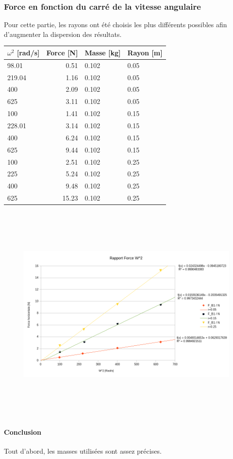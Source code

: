 \newpage
\subsubsection{Force en fonction du carré de la vitesse angulaire}

Pour cette partie, les rayons ont été choisis les plus différents possibles afin d'augmenter la dispersion des résultats.

\begin{table}[ht]
    \begin{tabular}{|l|r|l|l|}
	\hline
	$\omega^2$ [rad/s] & Force [N] & Masse [kg] & Rayon [m]\\
	\hline
	98.01	&0.51	&0.102	&0.05\\
	219.04	&1.16	&0.102	&0.05\\
	400	&2.09	&0.102	&0.05\\
	625	&3.11	&0.102	&0.05\\
	100	&1.41	&0.102	&0.15\\
	228.01	&3.14	&0.102	&0.15\\
	400	&6.24	&0.102	&0.15\\
	625	&9.44	&0.102	&0.15\\
	100	&2.51	&0.102	&0.25\\
	225	&5.24	&0.102	&0.25\\
	400	&9.48	&0.102	&0.25\\
	625	&15.23	&0.102	&0.25\\
	\hline
    \end{tabular}
\end{table}

\begin{figure}[!h]
    \centering
    \includegraphics[height=30em]{Save03.png}
\end{figure}

\paragraph{Conclusion}

Tout d'abord, les masses utilisées sont assez précises.
